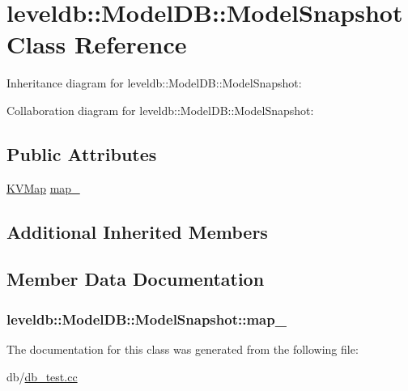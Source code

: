 \hypertarget{classleveldb_1_1_model_d_b_1_1_model_snapshot}{\section{leveldb\-:\-:Model\-D\-B\-:\-:Model\-Snapshot Class Reference}
\label{classleveldb_1_1_model_d_b_1_1_model_snapshot}
}


Inheritance diagram for leveldb\-:\-:Model\-D\-B\-:\-:Model\-Snapshot\-:


Collaboration diagram for leveldb\-:\-:Model\-D\-B\-:\-:Model\-Snapshot\-:
\subsection*{Public Attributes}
\begin{DoxyCompactItemize}
\item 
\hyperlink{namespaceleveldb_aac1e50450147be263e08252c6700f7a7}{K\-V\-Map} \hyperlink{classleveldb_1_1_model_d_b_1_1_model_snapshot_a7ae02397c293072b78874d0c073a10c5}{map\-\_\-}
\end{DoxyCompactItemize}
\subsection*{Additional Inherited Members}


\subsection{Member Data Documentation}
\hypertarget{classleveldb_1_1_model_d_b_1_1_model_snapshot_a7ae02397c293072b78874d0c073a10c5}{
\subsubsection[{map\-\_\-}]{ leveldb\-::\-Model\-D\-B\-::\-Model\-Snapshot\-::map\-\_\-}}\label{classleveldb_1_1_model_d_b_1_1_model_snapshot_a7ae02397c293072b78874d0c073a10c5}


The documentation for this class was generated from the following file\-:\begin{DoxyCompactItemize}
\item 
db/\hyperlink{db__test_8cc}{db\-\_\-test.\-cc}\end{DoxyCompactItemize}
